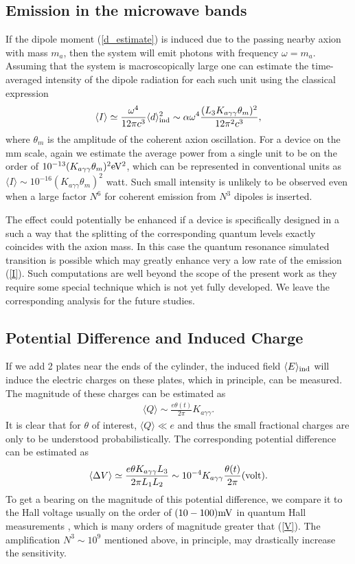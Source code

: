 \documentclass[ twocolumn,aps,prd,   
               preprintnumbers,numbers,sort&compress,nofootinbib,
                            showpacs,superscriptaddress,
               colorlinks,
               linkcolor=blue,   
               citecolor=blue]{revtex4-1}   \newcommand{\exclude}[1]{}
\newcommand{\be}{\begin{eqnarray}}
\newcommand{\ee}{\end{eqnarray}}
\def\la{\langle}
\def\ra{\rangle}
\begin{document}
\subsection{ Emission in the microwave bands }\label{subsec:photonemission}
If the dipole moment (\ref{d_estimate}) is induced due to the passing nearby axion with mass $m_a$, then the system will emit 
 photons  with frequency $\omega=m_a$. Assuming that the system is macroscopically large one can estimate  
 the time-averaged intensity of the dipole radiation for each such unit using the classical expression  
\be
\label{I}
\langle I \rangle \simeq\frac{\omega^4}{12 \pi c^3}\langle d\rangle_{\rm ind}^2\sim \alpha\omega^4 \frac{(L_3 K_{a\gamma\gamma}\theta_m)^2}{12\pi^2c^3},
\ee
where $\theta_m$ is the amplitude of the coherent axion oscillation. 
For a device on the mm scale, again we estimate the average power from a single unit to be on the order of $10^{-13}(K_{a\gamma\gamma}\theta_m)^2 \rm eV^2$, which can be represented in conventional units  as $\langle I \rangle \sim 10^{-16} (K_{a\gamma\gamma}\theta_m)^2$ watt.  Such small intensity is unlikely to be observed even when a large factor $N^6$ for   coherent  emission from $N^3$ dipoles is inserted. 

The effect could potentially be enhanced if a device is specifically designed in a such a way that the splitting of the corresponding quantum levels  exactly coincides with the axion mass. In this case  the quantum  resonance simulated transition is possible which 
may greatly enhance very a low rate of the emission (\ref{I}). Such  computations are well beyond the scope of the present work as they require  some special technique \cite{Yao:2016bps} which  is not yet fully developed.  We leave  the corresponding analysis  for the future studies. 
 

\subsection{Potential Difference and Induced Charge}\label{subsec:potentialdiff}
If we  add 2 plates near the ends of the cylinder,    the induced field $\langle E\rangle_{\rm ind}$ will  induce the electric  charges 
on these plates, which in principle, can be measured. The  magnitude of these charges can be estimated as 
\be
\la Q\ra \sim \frac{e\theta(t)}{2\pi} K_{a\gamma\gamma}. 
\ee
  It is clear that for $\theta$ of interest, $\la Q\ra  \ll e$ and thus the small fractional charges are only to be understood probabilistically. The corresponding potential difference
  can be estimated as 
\be
\label{V}
\la \Delta V\ra \simeq \frac{e\theta K_{a\gamma\gamma}L_3}{2\pi L_1L_2} \sim 10^{-4} K_{a\gamma\gamma}\frac{\theta(t)}{2\pi} (\rm volt).
\ee
To get a bearing on the magnitude of this potential difference, we compare it to the Hall voltage usually on the order of $(10- 100) \rm mV$ in quantum Hall measurements \cite{RevModPhys.58.519,FractionalQHallRev}, which is many orders of magnitude greater that (\ref{V}). The amplification $N^3\sim 10^9$ mentioned above, in principle,  may drastically increase the sensitivity. 
\end{document}
